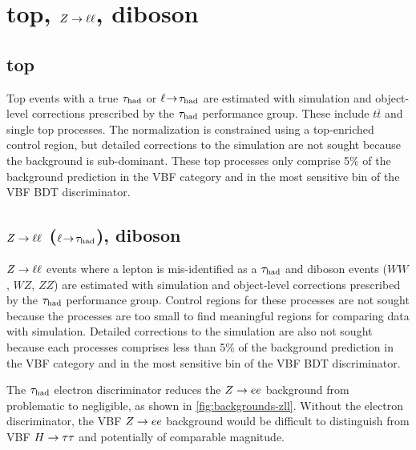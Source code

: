 \clearpage

\section{top, $Z \rightarrow \ell\ell$, diboson}
\label{sec:backgrounds-others}

\subsection{top}

Top events with a true $\tau_\text{had}$ or $\ell\!\rightarrow\!\tau_\text{had}$ are estimated with simulation and object-level corrections prescribed by the $\tau_\text{had}$ performance group. These include $t\overline{t}$ and single top processes. The normalization is constrained using a top-enriched control region, but detailed corrections to the simulation are not sought because the background is sub-dominant. These top processes only comprise 5\% of the background prediction in the VBF category and in the most sensitive bin of the VBF BDT discriminator.

\subsection{$Z \rightarrow \ell\ell$ ($\ell\!\rightarrow\!\tau_\text{had}$), diboson}

$Z \rightarrow \ell\ell$ events where a lepton is mis-identified as a $\tau_\text{had}$ and diboson events ($WW$, $WZ$, $ZZ$) are estimated with simulation and object-level corrections prescribed by the $\tau_\text{had}$ performance group. Control regions for these processes are not sought because the processes are too small to find meaningful regions for comparing data with simulation. Detailed corrections to the simulation are also not sought because each processes comprises less than 5\% of the background prediction in the VBF category and in the most sensitive bin of the VBF BDT discriminator.

The $\tau_\text{had}$ electron discriminator reduces the $Z \rightarrow ee$ background from problematic to negligible, as shown in \cref{fig:backgrounds-zll}. Without the electron discriminator, the VBF $Z \rightarrow ee$ background would be difficult to distinguish from VBF $H\rightarrow\tau\tau$ and potentially of comparable magnitude.

